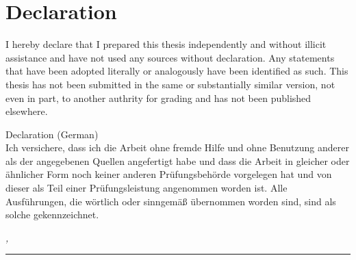 %
\chapter*{Declaration}
\label{sec:declaration}
\thispagestyle{empty}
\vspace*{-10mm}

I hereby declare that I prepared this thesis independently and without illicit assistance and have not used any sources without declaration. Any statements that have been adopted literally or analogously have been identified as such. This thesis has not been submitted in the same or substantially similar version, not even in part, to another authrity for grading and has not been published elsewhere. 


\vspace*{20mm}
{Declaration (German)}\label{sec:abstract-diff} \\

Ich versichere, dass ich die Arbeit ohne fremde Hilfe und ohne Benutzung anderer als der angegebenen Quellen angefertigt habe und dass die Arbeit in gleicher oder ähnlicher Form noch keiner anderen Prüfungsbehörde vorgelegen hat und von dieser als Teil einer Prüfungsleistung angenommen worden ist. Alle Ausführungen, die wörtlich oder sinngemäß übernommen worden sind, sind als solche gekennzeichnet.

\bigskip

\noindent\textit{\thesisUniversityCity, \thesisDate}

\smallskip

\begin{flushright}
	\begin{minipage}{5cm}
		\rule{\textwidth}{1pt}
		\centering\thesisName
	\end{minipage}
\end{flushright}

